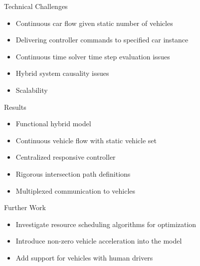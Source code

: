 \begin{frame}{Technical Challenges}
\begin{itemize}
\item Continuous car flow given static number of vehicles
\item Delivering controller commands to specified car instance
\item Continuous time solver time step evaluation issues
\item Hybrid system causality issues
\item Scalability
\end{itemize}
\end{frame}

\begin{frame}{Results}
\begin{itemize}
\item Functional hybrid model 
\item Continuous vehicle flow with static vehicle set
\item Centralized responsive controller
\item Rigorous intersection path definitions
\item Multiplexed communication to vehicles
\end{itemize}
\end{frame}

\begin{frame}{Further Work}
\begin{itemize}
\item Investigate resource scheduling algorithms for optimization
\item Introduce non-zero vehicle acceleration into the model
\item Add support for vehicles with human drivers
\end{itemize}
\end{frame}
